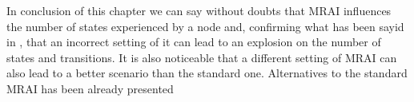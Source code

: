 In conclusion of this chapter we can say without doubts that \ac{MRAI} influences
the number of states experienced by a node and, confirming what has been sayid in
\cite{fabrikant2011there}, that an incorrect setting of it can lead
to an explosion on the number of states and transitions.
It is also noticeable that a different setting of \ac{MRAI} can also lead
to a better scenario than the standard one.
Alternatives to the standard \ac{MRAI} has been already presented 
